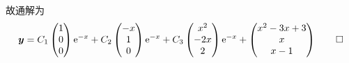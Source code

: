 \begin{solve}
故通解为
\[\bm{y}=C_1\begin{pmatrix}1\\0\\0\end{pmatrix}\mathrm{e}^{-x}+C_2\begin{pmatrix}-x\\1\\0\end{pmatrix}\mathrm{e}^{-x}+C_3\begin{pmatrix}x^2\\-2x\\2\end{pmatrix}\mathrm{e}^{-x}+\begin{pmatrix}x^2-3x+3\\x\\x-1\end{pmatrix}\qedhere\]
\end{solve}


